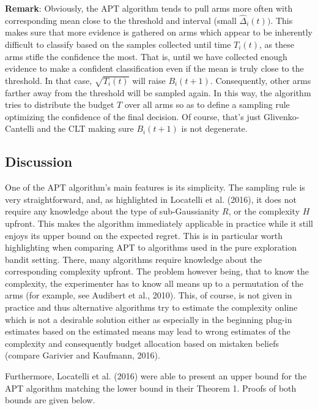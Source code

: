 \documentclass[12pt,]{article}
\begin{document}
\textbf{Remark}: Obviously, the APT algorithm tends to pull arms more
often with corresponding mean close to the threshold and interval (small
\(\hat{\Delta}_i(t))\). This makes sure that more evidence is gathered
on arms which appear to be inherently difficult to classify based on the
samples collected until time \(T_i(t)\), as these arms stifle the
confidence the most. That is, until we have collected enough evidence to
make a confident classification even if the mean is truly close to the
threshold. In that case, \(\sqrt{T_i(t)}\) will raise \(B_i(t+1)\).
Consequently, other arms farther away from the threshold will be sampled
again. In this way, the algorithm tries to distribute the budget \(T\)
over all arms so as to define a sampling rule optimizing the confidence
of the final decision. Of course, that's just Glivenko-Cantelli and the
CLT making sure \(B_i(t+1)\) is not degenerate.

\subsection{Discussion}\label{discussion}

One of the APT algorithm's main features is its simplicity. The sampling
rule is very straightforward, and, as highlighted in Locatelli et al.
(2016), it does not require any knowledge about the type of
sub-Gaussianity \(R\), or the complexity \(H\) upfront. This makes the
algorithm immediately applicable in practice while it still enjoys its
upper bound on the expected regret. This is in particular worth
highlighting when comparing APT to algorithms used in the pure
exploration bandit setting. There, many algorithms require knowledge
about the corresponding complexity upfront. The problem however being,
that to know the complexity, the experimenter has to know all means up
to a permutation of the arms (for example, see Audibert et al., 2010).
This, of course, is not given in practice and thus alternative
algorithms try to estimate the complexity online which is not a
desirable solution either as especially in the beginning plug-in
estimates based on the estimated means may lead to wrong estimates of
the complexity and consequently budget allocation based on mistaken
beliefs (compare Garivier and Kaufmann, 2016).

Furthermore, Locatelli et al. (2016) were able to present an upper bound
for the APT algorithm matching the lower bound in their Theorem 1.
Proofs of both bounds are given below.
\end{document}
